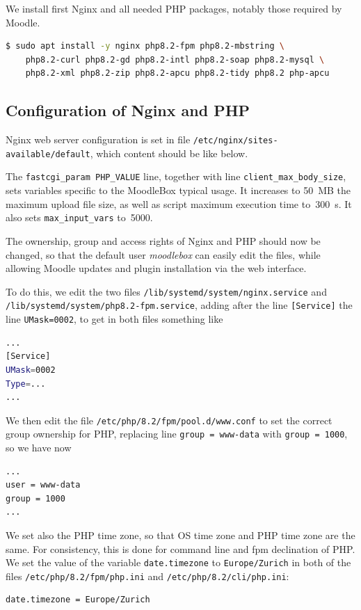 \documentclass[12pt]{article}
\begin{document}
We install first Nginx and all needed PHP packages, notably those required by Moodle.

\begin{lstlisting}[language=bash]
$ sudo apt install -y nginx php8.2-fpm php8.2-mbstring \
    php8.2-curl php8.2-gd php8.2-intl php8.2-soap php8.2-mysql \
    php8.2-xml php8.2-zip php8.2-apcu php8.2-tidy php8.2 php-apcu
\end{lstlisting}

\subsection{Configuration of Nginx and PHP}\label{ssec-nginx-php}

Nginx web server configuration is set in file \lstinline{/etc/nginx/sites-available/default}, which content should be like below.


The \lstinline{fastcgi_param PHP_VALUE} line, together with line \lstinline{client_max_body_size}, sets variables specific to the MoodleBox typical usage.
It increases to 50~MB the maximum upload file size, as well as script maximum execution time to~300~s.
It also sets \lstinline{max_input_vars} to~5000.

The ownership, group and access rights of Nginx and PHP should now be changed, so that the default user \emph{moodlebox} can easily edit the files, while allowing Moodle updates and plugin installation via the web interface.

To do this, we edit the two files \lstinline{/lib/systemd/system/nginx.service} and \lstinline{/lib/systemd/system/php8.2-fpm.service}, adding after the line \lstinline{[Service]} the line \lstinline{UMask=0002}, to get in both files something like
\begin{lstlisting}[language=bash]
...
[Service]
UMask=0002
Type=...
...
\end{lstlisting}
We then edit the file \lstinline{/etc/php/8.2/fpm/pool.d/www.conf} to set the correct group ownership for PHP, replacing line \lstinline{group = www-data} with \lstinline{group = 1000}, so we have now
\begin{lstlisting}[language=bash]
...
user = www-data
group = 1000
...
\end{lstlisting}
We set also the PHP time zone, so that OS time zone and PHP time zone are the same.
For consistency, this is done for command line and fpm declination of PHP.
We set the value of the variable \lstinline{date.timezone} to \lstinline{Europe/Zurich} in both of the files \lstinline{/etc/php/8.2/fpm/php.ini} and \lstinline{/etc/php/8.2/cli/php.ini}:
\begin{lstlisting}[language=bash]
date.timezone = Europe/Zurich
\end{lstlisting}
\end{document}
